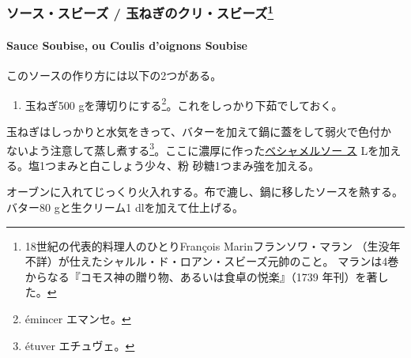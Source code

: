 \begin{recette}
\maeaki

\hypertarget{ux30bdux30fcux30b9ux30b9ux30d3ux30fcux30ba-ux7389ux306dux304eux306eux30afux30eaux30b9ux30d3ux30fcux30ba137}{%
\subsubsection[ソース・スビーズ /
玉ねぎのクリ・スビーズ]{\texorpdfstring{ソース・スビーズ /
玉ねぎのクリ・スビーズ\footnote{18世紀の代表的料理人のひとりFrançois
  Marinフランソワ・マラン
  （生没年不詳）が仕えたシャルル・ド・ロアン・スビーズ元帥のこと。
  マランは4巻からなる『コモス神の贈り物、あるいは食卓の悦楽』（1739
  年刊）を著した。}}{ソース・スビーズ / 玉ねぎのクリ・スビーズ}}\label{ux30bdux30fcux30b9ux30b9ux30d3ux30fcux30ba-ux7389ux306dux304eux306eux30afux30eaux30b9ux30d3ux30fcux30ba137}}

\hypertarget{sauce-soubise-ou-coulis-doignons-soubise}{%
\paragraph{Sauce Soubise, ou Coulis d'oignons
Soubise}\label{sauce-soubise-ou-coulis-doignons-soubise}}


このソースの作り方には以下の2つがある。

\begin{enumerate}
\def\labelenumi{\arabic{enumi}.}
\tightlist
\item
  玉ねぎ500 gを薄切りにする\footnote{émincer エマンセ。}。これをしっかり下茹でしておく。
\end{enumerate}

玉ねぎはしっかりと水気をきって、バターを加えて鍋に蓋をして弱火で色付か
ないよう注意して蒸し煮する\footnote{étuver エチュヴェ。}。ここに濃厚に作った\protect\hyperlink{sauce-bechamel}{ベシャメルソー
ス}\undemi{} Lを加える。塩1つまみと白こしょう少々、粉
砂糖1つまみ強を加える。

オーブンに入れてじっくり火入れする。布で漉し、鍋に移したソースを熱する。
バター80 gと生クリーム1 dlを加えて仕上げる。


\end{recette}
